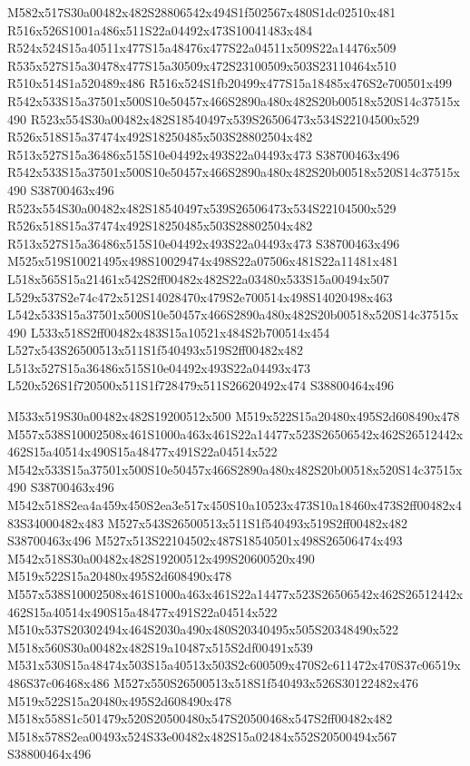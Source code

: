 \documentclass{article}
\begin{document}
\begin{multicols}{2}
M582x517S30a00482x482S28806542x494S1f502567x480S1dc02510x481 R516x526S1001a486x511S22a04492x473S10041483x484 R524x524S15a40511x477S15a48476x477S22a04511x509S22a14476x509 R535x527S15a30478x477S15a30509x472S23100509x503S23110464x510 R510x514S1a520489x486 R516x524S1fb20499x477S15a18485x476S2e700501x499 R542x533S15a37501x500S10e50457x466S2890a480x482S20b00518x520S14c37515x490 R523x554S30a00482x482S18540497x539S26506473x534S22104500x529 R526x518S15a37474x492S18250485x503S28802504x482 R513x527S15a36486x515S10e04492x493S22a04493x473 S38700463x496 R542x533S15a37501x500S10e50457x466S2890a480x482S20b00518x520S14c37515x490 S38700463x496 R523x554S30a00482x482S18540497x539S26506473x534S22104500x529 R526x518S15a37474x492S18250485x503S28802504x482 R513x527S15a36486x515S10e04492x493S22a04493x473 S38700463x496 M525x519S10021495x498S10029474x498S22a07506x481S22a11481x481 L518x565S15a21461x542S2ff00482x482S22a03480x533S15a00494x507 L529x537S2e74c472x512S14028470x479S2e700514x498S14020498x463 L542x533S15a37501x500S10e50457x466S2890a480x482S20b00518x520S14c37515x490 L533x518S2ff00482x483S15a10521x484S2b700514x454 L527x543S26500513x511S1f540493x519S2ff00482x482 L513x527S15a36486x515S10e04492x493S22a04493x473 L520x526S1f720500x511S1f728479x511S26620492x474 S38800464x496

M533x519S30a00482x482S19200512x500 M519x522S15a20480x495S2d608490x478 M557x538S10002508x461S1000a463x461S22a14477x523S26506542x462S26512442x462S15a40514x490S15a48477x491S22a04514x522 M542x533S15a37501x500S10e50457x466S2890a480x482S20b00518x520S14c37515x490 S38700463x496 M542x518S2ea4a459x450S2ea3e517x450S10a10523x473S10a18460x473S2ff00482x483S34000482x483 M527x543S26500513x511S1f540493x519S2ff00482x482 S38700463x496 M527x513S22104502x487S18540501x498S26506474x493 M542x518S30a00482x482S19200512x499S20600520x490 M519x522S15a20480x495S2d608490x478 M557x538S10002508x461S1000a463x461S22a14477x523S26506542x462S26512442x462S15a40514x490S15a48477x491S22a04514x522 M510x537S20302494x464S2030a490x480S20340495x505S20348490x522 M518x560S30a00482x482S19a10487x515S2df00491x539 M531x530S15a48474x503S15a40513x503S2c600509x470S2c611472x470S37c06519x486S37c06468x486 M527x550S26500513x518S1f540493x526S30122482x476 M519x522S15a20480x495S2d608490x478 M518x558S1c501479x520S20500480x547S20500468x547S2ff00482x482 M518x578S2ea00493x524S33e00482x482S15a02484x552S20500494x567 S38800464x496


\end{multicols}
\end{document}

